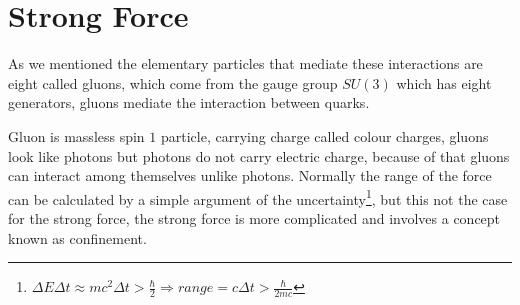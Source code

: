 

\section{Strong Force}
As we mentioned the elementary particles that mediate these interactions
are eight called gluons, which come from the gauge group $SU(3)$ which has eight generators, gluons mediate the interaction between quarks.




Gluon is massless spin $1$ particle, carrying charge called colour charges, gluons
look like photons but photons do not carry electric charge,
because of that gluons can interact among themselves unlike photons.
Normally the range of the force can be calculated by a
simple argument of the uncertainty\footnote{$\Delta E \Delta t \approx m c^2 \Delta t > \frac{\hbar}{2} \Longrightarrow range = c \Delta t > \frac{\hbar}{2 m c}$},
but this not the case for the strong force, the strong force is more complicated
and involves a concept known as confinement.

